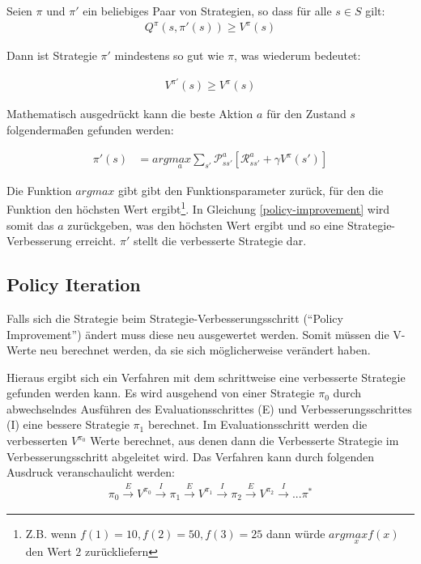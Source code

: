 \documentclass[10pt]{scrartcl}
\begin{document}
Seien $\pi$ und $\pi'$ ein beliebiges Paar von Strategien, so dass für alle $s \in S$ gilt:
\begin{align}
Q^\pi(s,\pi'(s)) \ge V^\pi(s)
\end{align}

Dann ist Strategie $\pi'$  mindestens so gut wie $\pi$, was wiederum bedeutet:

\begin{align}
V^{\pi'}(s) \ge V^\pi(s)
\end{align}

Mathematisch ausgedrückt kann die beste Aktion $a$ für den Zustand $s$ folgendermaßen gefunden werden:

\begin{align}\label{policy-improvement}
\pi'(s) &= arg\underset{a}{max}\sum_{s'}\mathcal{P}^a_{ss'}[\mathcal{R}^a_{ss'}+\gamma V^\pi(s')]
\end{align}

Die Funktion $argmax$ gibt gibt den Funktionsparameter zurück, für den die Funktion den höchsten Wert ergibt\footnote{Z.B. wenn $f(1)=10, f(2) = 50, f(3) = 25$ dann würde $arg\underset{x}{max}f(x)$ den Wert $2$ zurückliefern}. In Gleichung \ref{policy-improvement} wird somit das $a$ zurückgeben, was den höchsten Wert ergibt und so eine Strategie-Verbesserung erreicht. $\pi'$ stellt die verbesserte Strategie dar.

\subsection{Policy Iteration}
Falls sich die Strategie beim Strategie-Verbesserungsschritt (``Policy Improvement'') ändert muss diese neu ausgewertet werden. Somit müssen die V-Werte neu berechnet werden, da sie sich möglicherweise verändert haben.

Hieraus ergibt sich ein Verfahren mit dem schrittweise eine verbesserte Strategie gefunden werden kann. Es wird ausgehend von einer Strategie $\pi_0$ durch abwechselndes Ausführen des Evaluationsschrittes (E) und Verbesserungsschrittes (I) eine bessere Strategie $\pi_1$ berechnet. Im Evaluationsschritt werden die verbesserten $V^{\pi_0}$ Werte berechnet, aus denen dann die Verbesserte Strategie im Verbesserungsschritt abgeleitet wird. Das Verfahren kann durch  folgenden Ausdruck veranschaulicht werden:
\begin{align}
\pi_0 \overset{E}{\longrightarrow} V^{\pi_0} \overset{I}{\longrightarrow} \pi_1 \overset{E}{\longrightarrow} V^{\pi_1} \overset{I}{\longrightarrow} \pi_2  \overset{E}{\longrightarrow} V^{\pi_2} \overset{I}{\longrightarrow} ... \pi^*
\end{align}
\end{document}
